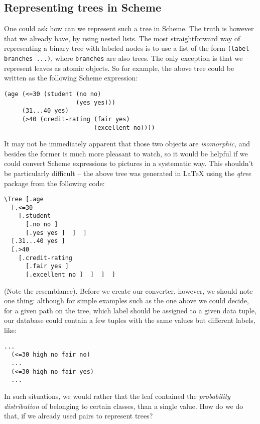 \subsection{Representing trees in Scheme}

One could ask how can we represent such a tree in Scheme.
The truth is however that we already have, by using nested
lists. The most straightforward way of representing a binary
tree with labeled nodes is to use a list of the form
\texttt{(label branches ...)}, where \texttt{branches}
are also trees. The only exception is that we represent
leaves as atomic objects. So for example, the above
tree could be written as the following Scheme expression:
\begin{Verbatim}[samepage=true]
(age (<=30 (student (no no)
                    (yes yes)))
     (31...40 yes)
     (>40 (credit-rating (fair yes)
                         (excellent no))))
\end{Verbatim}

It may not be immediately apparent that those two objects
are \textit{isomorphic}, and besides the former is much more
pleasant to watch, so it would be helpful if we could convert
Scheme expressions to pictures in a systematic way. This shouldn't
be particularly difficult -- the above tree was generated
in \LaTeX{} using the \textit{qtree} package from the following
code:
\begin{Verbatim}[samepage=true]
\Tree [.age 
  [.<=30 
    [.student 
      [.no no ]  
      [.yes yes ]  ]  ]  
  [.31...40 yes ]  
  [.>40 
    [.credit-rating 
      [.fair yes ]  
      [.excellent no ]  ]  ]  ]
\end{Verbatim}

(Note the resemblance). Before we create our converter, however,
we should note one thing: although for simple examples such as
the one above we could decide, for a given path on the tree,
which label should be assigned to a given data tuple, our
database could contain a few tuples with the same values but
different labels, like:

\begin{Verbatim}[samepage=true]
  ...
  (<=30 high no fair no)
  ...
  (<=30 high no fair yes)
  ...
\end{Verbatim}

In such situations, we would rather that the leaf contained
the \textit{probability distribution} of belonging to certain
classes, than a single value. How do we do that, if we already
used pairs to represent trees?

